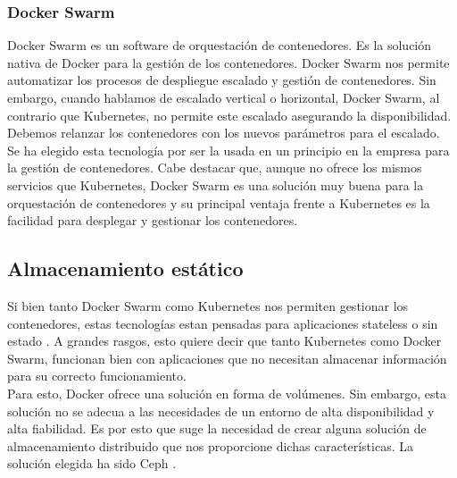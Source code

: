 		\subsubsection{Docker Swarm}
		\begin{paragraph}
			Docker Swarm es un software de orquestación de contenedores. Es la solución nativa de Docker para la gestión de los contenedores. Docker Swarm nos permite automatizar los procesos de despliegue escalado y gestión de contenedores. Sin embargo, cuando hablamos de escalado vertical o horizontal, Docker Swarm, al contrario que Kubernetes, no permite este escalado asegurando la disponibilidad. Debemos relanzar los contenedores con los nuevos parámetros para el escalado. \\
			Se ha elegido esta tecnología por ser la usada en un principio en la empresa para la gestión de contenedores. Cabe destacar que, aunque no ofrece los mismos servicios que Kubernetes, Docker Swarm es una solución muy buena para la orquestación de contenedores y su principal ventaja frente a Kubernetes es la facilidad para desplegar y gestionar los contenedores.
		\end{paragraph}
	\subsection{Almacenamiento estático}
		\label{ceph}
		\begin{paragraph}
			Si bien tanto Docker Swarm como Kubernetes nos permiten gestionar los contenedores, estas tecnologías estan pensadas para aplicaciones stateless o sin estado \cite{stateless:online}. A grandes rasgos, esto quiere decir que tanto Kubernetes como Docker Swarm, funcionan bien con aplicaciones que no necesitan almacenar información para su correcto funcionamiento. \\
			Para esto, Docker ofrece una solución en forma de volúmenes. Sin embargo, esta solución no se adecua a las necesidades de un entorno de alta disponibilidad  y alta fiabilidad. Es por esto que suge la necesidad de crear alguna solución de almacenamiento distribuido que nos proporcione dichas características. La solución elegida ha sido Ceph \cite{ceph:online}.
		\end{paragraph}
